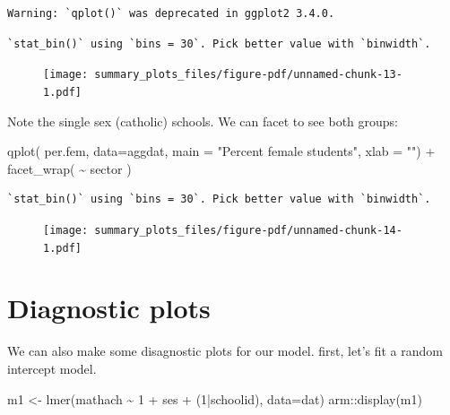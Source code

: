\documentclass[
  letterpaper,
  DIV=11,
  numbers=noendperiod]{scrreprt}
\newenvironment{Shaded}{\begin{snugshade}}{\end{snugshade}}
\newcommand{\AttributeTok}[1]{\textcolor[rgb]{0.49,0.56,0.16}{#1}}
\newcommand{\DecValTok}[1]{\textcolor[rgb]{0.25,0.63,0.44}{#1}}
\newcommand{\FunctionTok}[1]{\textcolor[rgb]{0.02,0.16,0.49}{#1}}
\newcommand{\NormalTok}[1]{\textcolor[rgb]{0.00,0.44,0.13}{#1}}
\newcommand{\OtherTok}[1]{\textcolor[rgb]{0.00,0.44,0.13}{#1}}
\newcommand{\SpecialCharTok}[1]{\textcolor[rgb]{0.25,0.44,0.63}{#1}}
\newcommand{\StringTok}[1]{\textcolor[rgb]{0.25,0.44,0.63}{#1}}
\begin{document}
\begin{verbatim}
Warning: `qplot()` was deprecated in ggplot2 3.4.0.
\end{verbatim}

\begin{verbatim}
`stat_bin()` using `bins = 30`. Pick better value with `binwidth`.
\end{verbatim}

\begin{figure}[H]

{\centering \texttt{[image: summary\_plots\_files/figure-pdf/unnamed-chunk-13-1.pdf]}

}

\end{figure}

Note the single sex (catholic) schools. We can facet to see both groups:

\begin{Shaded}
\begin{Highlighting}[]
\FunctionTok{qplot}\NormalTok{( per.fem, }\AttributeTok{data=}\NormalTok{aggdat,}
       \AttributeTok{main =} \StringTok{"Percent female students"}\NormalTok{, }
       \AttributeTok{xlab =} \StringTok{""}\NormalTok{) }\SpecialCharTok{+}
  \FunctionTok{facet\_wrap}\NormalTok{( }\SpecialCharTok{\textasciitilde{}}\NormalTok{ sector )}
\end{Highlighting}
\end{Shaded}

\begin{verbatim}
`stat_bin()` using `bins = 30`. Pick better value with `binwidth`.
\end{verbatim}

\begin{figure}[H]

{\centering \texttt{[image: summary\_plots\_files/figure-pdf/unnamed-chunk-14-1.pdf]}

}

\end{figure}

\hypertarget{diagnostic-plots}{%
\section{Diagnostic plots}\label{diagnostic-plots}}

We can also make some disagnostic plots for our model. first, let's fit
a random intercept model.

\begin{Shaded}
\begin{Highlighting}[]
\NormalTok{m1 }\OtherTok{\textless{}{-}} \FunctionTok{lmer}\NormalTok{(mathach }\SpecialCharTok{\textasciitilde{}} \DecValTok{1} \SpecialCharTok{+}\NormalTok{ ses }\SpecialCharTok{+}\NormalTok{ (}\DecValTok{1}\SpecialCharTok{|}\NormalTok{schoolid), }\AttributeTok{data=}\NormalTok{dat)}
\NormalTok{arm}\SpecialCharTok{::}\FunctionTok{display}\NormalTok{(m1)}
\end{Highlighting}
\end{Shaded}
\end{document}
